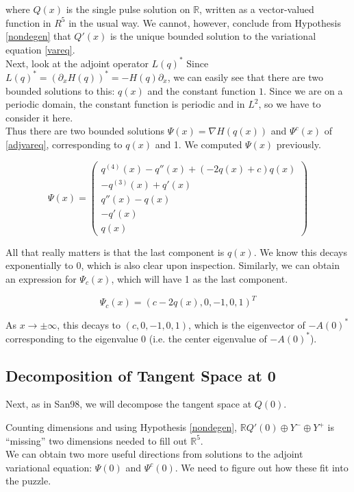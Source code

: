 \documentclass[12pt]{article}
\def\R{{\mathbb R}}
\begin{document}
where $Q(x)$ is the single pulse solution on $\R$, written as a vector-valued function in $R^5$ in the usual way. We cannot, however, conclude from Hypothesis \ref{nondegen} that $Q'(x)$ is the unique bounded solution to the variational equation \eqref{vareq}.\\

Next, look at the adjoint operator $L(q)^*$ Since $L(q)^* = (\partial_x H(q))^* = -H(q) \partial_x$, we can easily see that there are two bounded solutions to this: $q(x)$ and the constant function $1$. Since we are on a periodic domain, the constant function is periodic and in $L^2$, so we have to consider it here.\\

Thus there are two bounded solutions $\Psi(x) = \nabla H(q(x))$ and $\Psi^c(x)$ of \eqref{adjvareq}, corresponding to $q(x)$ and 1. We computed $\Psi(x)$ previously.

\[
\Psi(x) = \begin{pmatrix}
q^{(4)}(x) - q''(x) + (-2q(x) + c)q(x)\\
-q^{(3)}(x) + q'(x) \\
q''(x) - q(x) \\
-q'(x) \\
q(x)
\end{pmatrix}
\]

All that really matters is that the last component is $q(x)$. We know this decays exponentially to 0, which is also clear upon inspection. Similarly, we can obtain an expression for $\Psi_c(x)$, which will have 1 as the last component.

\[
\Psi_c(x) = (c - 2 q(x), 0, -1, 0, 1)^T
\]

As $x \rightarrow \pm \infty$, this decays to $(c, 0, -1, 0, 1)$, which is the eigenvector of $-A(0)^*$ corresponding to the eigenvalue $0$ (i.e. the center eigenvalue of $-A(0)^*$).\\

\subsection{Decomposition of Tangent Space at 0}

Next, as in San98, we will decompose the tangent space at $Q(0)$. 

Counting dimensions and using Hypothesis \ref{nondegen}, $\R Q'(0) \oplus Y^- \oplus Y^+$ is ``missing'' two dimensions needed to fill out $\R^5$.\\

We can obtain two more useful directions from solutions to the adjoint variational equation: $\Psi(0)$ and $\Psi^c(0)$. We need to figure out how these fit into the puzzle.\\
\end{document}
